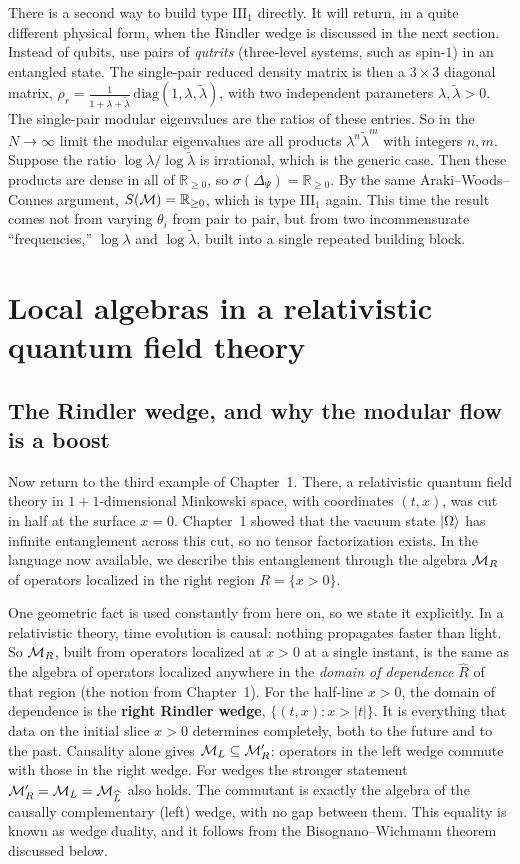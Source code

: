 There is a second way to build type $\mathrm{III}_1$ directly. It will return, in a quite different physical
form, when the Rindler wedge is discussed in the next section. Instead of qubits, use pairs of \emph{qutrits}
(three-level systems, such as spin-$1$) in an entangled state. The single-pair reduced density matrix is then a
$3\times3$ diagonal matrix, $\rho_r=\tfrac{1}{1+\lambda+\tilde\lambda}\,\mathrm{diag}(1,\lambda,\tilde\lambda)$,
with two independent parameters $\lambda,\tilde\lambda>0$. The single-pair modular eigenvalues are the ratios of
these entries. So in the $N\to\infty$ limit the modular eigenvalues are all products $\lambda^n\tilde\lambda^m$
with integers $n,m$. Suppose the ratio $\log\lambda/\log\tilde\lambda$ is irrational, which is the generic
case. Then these products are dense in all of $\mathbb R_{\ge0}$, so $\sigma(\Delta_\Psi)=\mathbb R_{\ge0}$. By
the same Araki--Woods--Connes argument, $S(\mathcal{M})=\mathbb R_{\ge0}$, which is type $\mathrm{III}_1$ again. This
time the result comes not from varying $\theta_i$ from pair to pair, but from two incommensurate
``frequencies,'' $\log\lambda$ and $\log\tilde\lambda$, built into a single repeated building block.

\section{Local algebras in a relativistic quantum field theory}

\subsection*{The Rindler wedge, and why the modular flow is a boost}

Now return to the third example of Chapter~1. There, a relativistic quantum field theory in
$1{+}1$-dimensional Minkowski space, with coordinates $(t,x)$, was cut in half at the surface $x=0$. Chapter~1
showed that the vacuum state $\ket\Omega$ has infinite entanglement across this cut, so no tensor factorization
exists. In the language now available, we describe this entanglement through the algebra $\mathcal{M}_R$ of operators
localized in the right region $R=\{x>0\}$.

One geometric fact is used constantly from here on, so we state it explicitly. In a relativistic theory, time
evolution is causal: nothing propagates faster than light. So $\mathcal{M}_R$, built from operators localized at $x>0$ at
a single instant, is the same as the algebra of operators localized anywhere in the \emph{domain of dependence}
$\widehat R$ of that region (the notion from Chapter~1). For the half-line $x>0$, the domain of dependence is
the \textbf{right Rindler wedge}, $\{(t,x): x>|t|\}$. It is everything that data on the initial slice $x>0$
determines completely, both to the future and to the past. Causality alone gives $\mathcal{M}_L\subseteq\mathcal{M}_R'$: operators
in the left wedge commute with those in the right wedge. For wedges the stronger statement
$\mathcal{M}_R' = \mathcal{M}_L = \mathcal{M}_{\widehat L}$ also holds. The commutant is exactly the algebra of the causally complementary
(left) wedge, with no gap between them. This equality is known as wedge duality, and it follows from the
Bisognano--Wichmann theorem discussed below.

